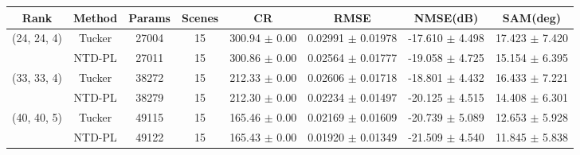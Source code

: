 \begin{tabular}{c|c|c|c|c|c|c|c}
    \hline
    Rank & Method & Params & Scenes & CR & RMSE & NMSE(dB) & SAM(deg) \\
    \hline
    (24, 24, 4) & Tucker & 27004 & 15 & 300.94 $\pm$ 0.00 & 0.02991 $\pm$ 0.01978 & -17.610 $\pm$ 4.498 & 17.423 $\pm$ 7.420 \\
     & NTD-PL & 27011 & 15 & 300.86 $\pm$ 0.00 & 0.02564 $\pm$ 0.01777 & -19.058 $\pm$ 4.725 & 15.154 $\pm$ 6.395 \\
    \hline
    (33, 33, 4) & Tucker & 38272 & 15 & 212.33 $\pm$ 0.00 & 0.02606 $\pm$ 0.01718 & -18.801 $\pm$ 4.432 & 16.433 $\pm$ 7.221 \\
     & NTD-PL & 38279 & 15 & 212.30 $\pm$ 0.00 & 0.02234 $\pm$ 0.01497 & -20.125 $\pm$ 4.515 & 14.408 $\pm$ 6.301 \\
    \hline
    (40, 40, 5) & Tucker & 49115 & 15 & 165.46 $\pm$ 0.00 & 0.02169 $\pm$ 0.01609 & -20.739 $\pm$ 5.089 & 12.653 $\pm$ 5.928 \\
     & NTD-PL & 49122 & 15 & 165.43 $\pm$ 0.00 & 0.01920 $\pm$ 0.01349 & -21.509 $\pm$ 4.540 & 11.845 $\pm$ 5.838 \\
    \bottomrule
\end{tabular}

